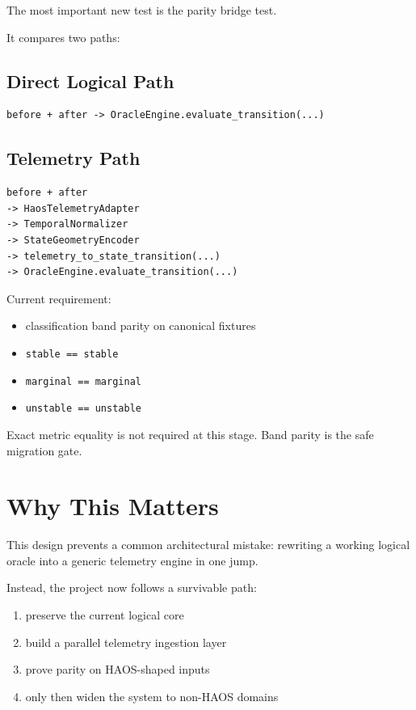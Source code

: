 \documentclass[11pt]{article}
\begin{document}
The most important new test is the parity bridge test.

It compares two paths:

\subsection{Direct Logical Path}

\begin{verbatim}
before + after -> OracleEngine.evaluate_transition(...)
\end{verbatim}

\subsection{Telemetry Path}

\begin{verbatim}
before + after
-> HaosTelemetryAdapter
-> TemporalNormalizer
-> StateGeometryEncoder
-> telemetry_to_state_transition(...)
-> OracleEngine.evaluate_transition(...)
\end{verbatim}

Current requirement:

\begin{itemize}
\item classification band parity on canonical fixtures
\item \texttt{stable == stable}
\item \texttt{marginal == marginal}
\item \texttt{unstable == unstable}
\end{itemize}

Exact metric equality is not required at this stage.
Band parity is the safe migration gate.

\section{Why This Matters}

This design prevents a common architectural mistake:
rewriting a working logical oracle into a generic telemetry engine in one jump.

Instead, the project now follows a survivable path:

\begin{enumerate}
\item preserve the current logical core
\item build a parallel telemetry ingestion layer
\item prove parity on HAOS-shaped inputs
\item only then widen the system to non-HAOS domains
\end{enumerate}
\end{document}

